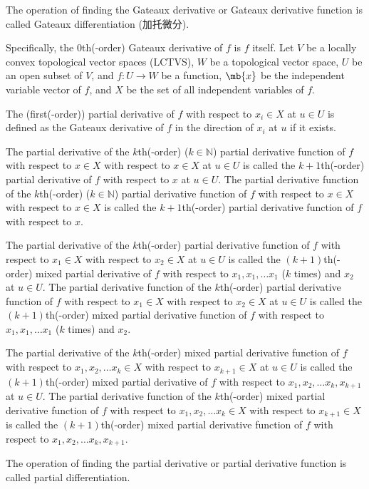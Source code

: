 \documentclass[a4paper,12pt]{report}
\begin{document}
The operation of finding the Gateaux derivative or Gateaux derivative function is called Gateaux differentiation (加托微分).

Specifically, the $0$th(-order) Gateaux derivative of $f$ is $f$ itself.
Let $V$ be a locally convex topological vector spaces (LCTVS), $W$ be a topological vector space, $U$ be an open subset of $V$, and $f\colon U\to W$ be a function, $\mb{x}$ be the independent variable vector of $f$, and $X$ be the set of all independent variables of $f$.

The (first(-order)) partial derivative of $f$ with respect to $x_i\in X$ at $u\in U$ is defined as the Gateaux derivative of $f$ in the direction of $x_i$ at $u$ if it exists.

The partial derivative of the $k$th(-order) ($k\in\mathbb{N}$) partial derivative function of $f$ with respect to $ x \in X$ with respect to $ x \in X$ at $u\in U$ is called the $k+1$th(-order) partial derivative of $f$ with respect to $ x$ at $u\in U$. The partial derivative function of the $k$th(-order) ($k\in\mathbb{N}$) partial derivative function of $f$ with respect to $ x \in X$ with respect to $ x \in X$ is called the $k+1$th(-order) partial derivative function of $f$ with respect to $ x$.

The partial derivative of the $k$th(-order) partial derivative function of $f$ with respect to $ x_1\in X$ with respect to $ x_2\in X$ at $u\in U$ is called the $(k+1)$th(-order) mixed partial derivative of $f$ with respect to $ x_1, x_1,\dots  x_1$ ($k$ times) and $ x_2$ at $u\in U$. The partial derivative function of the $k$th(-order) partial derivative function of $f$ with respect to $ x_1\in X$ with respect to $ x_2\in X$ at $u\in U$ is called the $(k+1)$th(-order) mixed partial derivative function of $f$ with respect to $ x_1, x_1,\dots  x_1$ ($k$ times) and $ x_2$.

The partial derivative of the $k$th(-order) mixed partial derivative function of $f$ with respect to $ x_1, x_2,\dots  x_k\in X$ with respect to $ x_{k+1}\in X$ at $u\in U$ is called the $(k+1)$th(-order) mixed partial derivative of $f$ with respect to $ x_1, x_2,\dots  x_k, x_{k+1}$ at $u\in U$. The partial derivative function of the $k$th(-order) mixed partial derivative function of $f$ with respect to $ x_1, x_2,\dots  x_k\in X$ with respect to $ x_{k+1}\in X$ is called the $(k+1)$th(-order) mixed partial derivative function of $f$ with respect to $ x_1, x_2,\dots  x_k, x_{k+1}$.

The operation of finding the partial derivative or partial derivative function is called partial differentiation.
\end{document}
